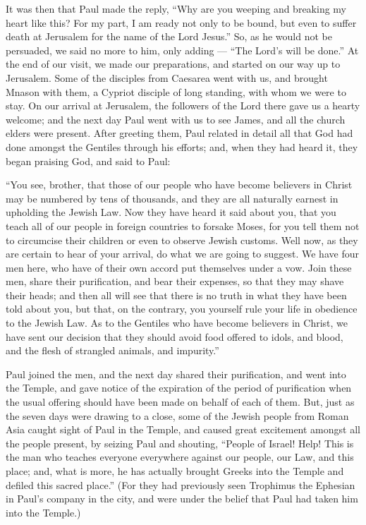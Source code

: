  It was then that Paul made the reply, ``Why are you
weeping and breaking my heart like this? For my part, I am ready not
only to be bound, but even to suffer death at Jerusalem for the name of
the Lord Jesus.''  So, as he would not be persuaded, we
said no more to him, only adding --- ``The Lord's will be done.''
 At the end of our visit, we made our preparations, and
started on our way up to Jerusalem.  Some of the disciples
from Caesarea went with us, and brought Mnason with them, a Cypriot
disciple of long standing, with whom we were to stay.  On
our arrival at Jerusalem, the followers of the Lord there gave us a
hearty welcome;  and the next day Paul went with us to see
James, and all the church elders were present.  After
greeting them, Paul related in detail all that God had done amongst the
Gentiles through his efforts;  and, when they had heard it,
they began praising God, and said to Paul:

``You see, brother, that those of our people who have become believers
in Christ may be numbered by tens of thousands, and they are all
naturally earnest in upholding the Jewish Law.  Now they
have heard it said about you, that you teach all of our people in
foreign countries to forsake Moses, for you tell them not to circumcise
their children or even to observe Jewish customs.  Well
now, as they are certain to hear of your arrival, do what we are going
to suggest.  We have four men here, who have of their own
accord put themselves under a vow.  Join these men, share
their purification, and bear their expenses, so that they may shave
their heads; and then all will see that there is no truth in what they
have been told about you, but that, on the contrary, you yourself rule
your life in obedience to the Jewish Law.  As to the
Gentiles who have become believers in Christ, we have sent our decision
that they should avoid food offered to idols, and blood, and the flesh
of strangled animals, and impurity.''

 Paul joined the men, and the next day shared their
purification, and went into the Temple, and gave notice of the
expiration of the period of purification when the usual offering should
have been made on behalf of each of them.  But, just as the
seven days were drawing to a close, some of the Jewish people from Roman
Asia caught sight of Paul in the Temple, and caused great excitement
amongst all the people present, by seizing Paul and shouting,
 ``People of Israel! Help! This is the man who teaches
everyone everywhere against our people, our Law, and this place; and,
what is more, he has actually brought Greeks into the Temple and defiled
this sacred place.''  (For they had previously seen
Trophimus the Ephesian in Paul's company in the city, and were under the
belief that Paul had taken him into the Temple.)

